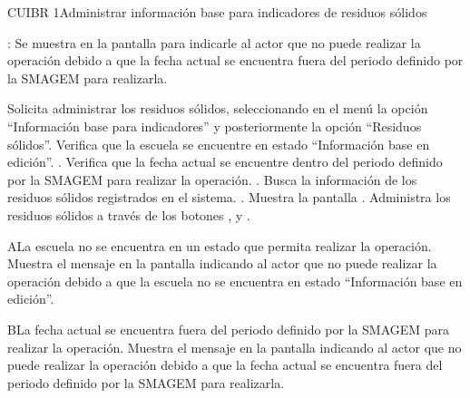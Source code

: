 \begin{UseCase}{CUIBR 1}{Administrar información base para indicadores de residuos sólidos}
{\begin{UClist}
	    \UCli {}: Se muestra en la pantalla  para indicarle al actor que no puede realizar la operación debido a que la fecha actual se encuentra fuera del periodo definido por la SMAGEM para realizarla.
	\end{UClist}
    }


\end{UseCase}

 \begin{UCtrayectoria}
    \UCpaso[\UCactor] Solicita administrar los residuos sólidos, seleccionando en el menú  la opción ``Información base para indicadores'' y posteriormente la opción ``Residuos sólidos''. 
    \UCpaso[\UCsist] Verifica que la escuela se encuentre en estado ``Información base en edición''. .
    \UCpaso[\UCsist] Verifica que la fecha actual se encuentre dentro del periodo definido por la SMAGEM para realizar la operación. .
    \UCpaso[\UCsist] Busca la información de los residuos sólidos registrados en el sistema. .
    \UCpaso[\UCsist] Muestra la pantalla .
    \UCpaso[\UCactor] Administra los residuos sólidos a través de los botones , \botEdit y \botKo  . \label{cuibr1:Registrar}
 \end{UCtrayectoria}
 
 \begin{UCtrayectoriaA}{A}{La escuela no se encuentra en un estado que permita realizar la operación.}
    \UCpaso[\UCsist] Muestra el mensaje  en la pantalla  indicando al actor que no puede realizar la operación debido a que la escuela no se encuentra en estado ``Información base en edición''. 
 \end{UCtrayectoriaA}
 
 \begin{UCtrayectoriaA}{B}{La fecha actual se encuentra fuera del periodo definido por la SMAGEM para realizar la operación.}
    \UCpaso[\UCsist] Muestra el mensaje  en la pantalla  indicando al actor que no puede realizar la operación debido a que la fecha actual se encuentra fuera del periodo definido por la SMAGEM para realizarla. 
 \end{UCtrayectoriaA}
 
